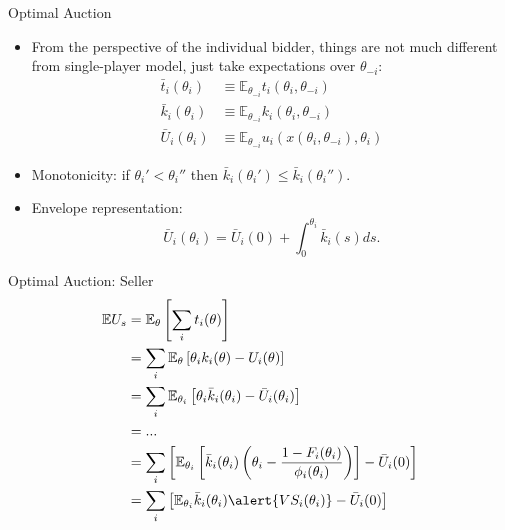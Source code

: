 \documentclass[english,10pt
,aspectratio=169
]{beamer}
\begin{document}
\begin{frame}{Optimal Auction}
\begin{itemize}
	\item From the perspective of the individual bidder, things are not much different from single-player model, just take expectations over $\theta_{-i}$:
	\begin{align*}
		\bar{t}_i(\theta_i) &\equiv \mathbb{E}_{\theta_{-i}} t_i(\theta_i,\theta_{-i})
		\\
		\bar{k}_i(\theta_i) &\equiv \mathbb{E}_{\theta_{-i}} k_i(\theta_i,\theta_{-i})
		\\
		\bar{U}_i(\theta_i) &\equiv \mathbb{E}_{\theta_{-i}} u_i(x(\theta_i,\theta_{-i}),\theta_i)
	\end{align*}
	\item Monotonicity: if $\theta_i' < \theta_i''$ then 
	$\bar{k}_i(\theta_i') \leq \bar{k}_i(\theta_i'').$
	\item Envelope representation: 
	$$\bar{U}_i(\theta_i) = \bar{U}_i(0) + \int_0^{\theta_i} \bar{k}_i(s) ds.$$
\end{itemize}
\end{frame}


\begin{frame}{Optimal Auction: Seller}
\begin{align*}
	\mathbb{E} U_s &= \mathbb{E}_\theta \left[ \sum_i t_i(\theta) \right]
	\\ &= \sum_i \mathbb{E}_{\theta} \left[ \theta_i k_i(\theta) - U_i(\theta) \right]
	\\ &= \sum_i \mathbb{E}_{\theta_i} \left[ \theta_i \bar{k}_i(\theta_i) - \bar{U}_i(\theta_i) \right]
	\\  &= ...
	\\ &= \sum_i \left[ \mathbb{E}_{\theta_i} \left[ \bar{k}_i(\theta_i) \left( \theta_i - \frac{1-F_i(\theta_i)}{\phi_i(\theta_i)} \right) \right] - \bar{U}_i(0)\right]
	\\ &= \sum_i \left[ \mathbb{E}_{\theta_i} \bar{k}_i(\theta_i) \alert{VS_i(\theta_i)} - \bar{U}_i(0) \right]
\end{align*}
\end{frame}
\end{document}
